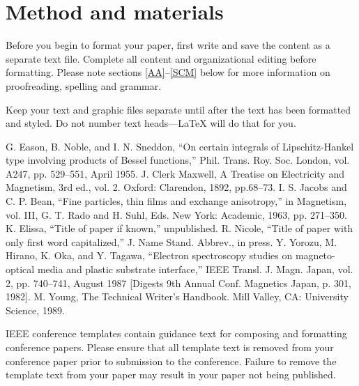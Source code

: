 \documentclass[conference]{IEEEtran}
\begin{document}
	\section{Method and  materials}
	Before you begin to format your paper, first write and save the content as a 
	separate text file. Complete all content and organizational editing before 
	formatting. Please note sections \ref{AA}--\ref{SCM} below for more information on 
	proofreading, spelling and grammar.
	
	Keep your text and graphic files separate until after the text has been 
	formatted and styled. Do not number text heads---{\LaTeX} will do that 
	for you.
	
	
	\begin{thebibliography}{00}
		 G. Eason, B. Noble, and I. N. Sneddon, ``On certain integrals of Lipschitz-Hankel type involving products of Bessel functions,'' Phil. Trans. Roy. Soc. London, vol. A247, pp. 529--551, April 1955.
		 J. Clerk Maxwell, A Treatise on Electricity and Magnetism, 3rd ed., vol. 2. Oxford: Clarendon, 1892, pp.68--73.
		 I. S. Jacobs and C. P. Bean, ``Fine particles, thin films and exchange anisotropy,'' in Magnetism, vol. III, G. T. Rado and H. Suhl, Eds. New York: Academic, 1963, pp. 271--350.
		 K. Elissa, ``Title of paper if known,'' unpublished.
		 R. Nicole, ``Title of paper with only first word capitalized,'' J. Name Stand. Abbrev., in press.
		 Y. Yorozu, M. Hirano, K. Oka, and Y. Tagawa, ``Electron spectroscopy studies on magneto-optical media and plastic substrate interface,'' IEEE Transl. J. Magn. Japan, vol. 2, pp. 740--741, August 1987 [Digests 9th Annual Conf. Magnetics Japan, p. 301, 1982].
		 M. Young, The Technical Writer's Handbook. Mill Valley, CA: University Science, 1989.
	\end{thebibliography}
	\vspace{12pt}
	\color{red}
	IEEE conference templates contain guidance text for composing and formatting conference papers. Please ensure that all template text is removed from your conference paper prior to submission to the conference. Failure to remove the template text from your paper may result in your paper not being published.
	
\end{document}
